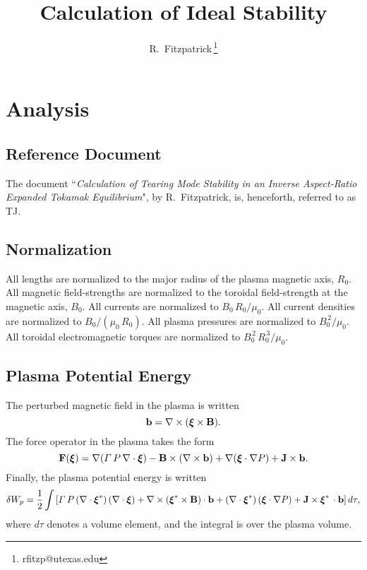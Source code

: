\documentclass[12pt,prb,aps,notitlepage]{revtex4-1}
\newcommand{\bxi}{\mbox{\boldmath$\xi$}}
\begin{document}
\title{Calculation of Ideal Stability}
\author{R.~Fitzpatrick\,\footnote{rfitzp@utexas.edu}}
\begin{abstract}
\end{abstract}
\maketitle

\section{Analysis}
\subsection{Reference Document}
The document ``{\em Calculation of Tearing Mode Stability in an Inverse Aspect-Ratio Expanded Tokamak Equilibrium}", by R.~Fitzpatrick,  is, henceforth,
referred to as TJ. 

\subsection{Normalization}\label{coords}
All lengths are normalized to  the major radius of the plasma magnetic axis, $R_0$. All magnetic field-strengths
are normalized to the  toroidal field-strength at the magnetic axis, $B_0$. All currents are normalized to $B_0\,R_0/\mu_0$. All current densities are normalized to $B_0/(\mu_0\,R_0)$.  All plasma pressures are normalized to $B_0^{\,2}/\mu_0$.
All toroidal electromagnetic torques are normalized to $B_0^{\,2}\,R_0^{\,3}/\mu_0$. 

\subsection{Plasma Potential Energy}
The perturbed magnetic field in the plasma is written 
\begin{equation}
{\bf b} = \nabla\times (\bxi\times{\bf B}).
\end{equation}
The force operator in the plasma takes the form 
\begin{equation}
{\bf F}(\bxi)= \nabla({\mit\Gamma}\,P\,\nabla\cdot\bxi) - {\bf B}\times(\nabla\times {\bf b})+\nabla(\bxi\cdot\nabla P)+{\bf J}\times  {\bf b}.
\end{equation}
Finally, the plasma potential energy is written 
\begin{equation}
\delta W_p = \frac{1}{2}\int\left[{\mit\Gamma}\,P\,(\nabla\cdot\bxi^\ast)\,(\nabla\cdot\bxi)+ \nabla\times (\bxi^\ast\times {\bf B})\cdot {\bf b}
+(\nabla\cdot\bxi^\ast)\,(\bxi\cdot\nabla P)+
{\bf J}\times \bxi^\ast\,\cdot{\bf b}\right]d\tau,
\end{equation}
where $d\tau$ denotes a volume element, and the integral is over the plasma volume. 
\end{document}
